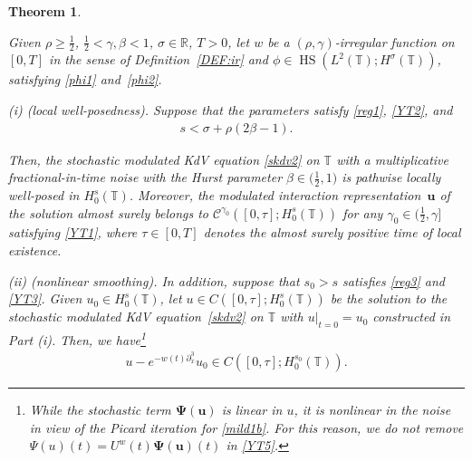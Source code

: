 \documentclass[letterpaper, 11pt,  reqno]{amsart}
\newtheorem{theorem}{Theorem} [section]
\DeclareMathOperator{\HS}{HS}
\newcommand{\1}{\hspace{0.5mm}\textup{I}\hspace{0.5mm}}
\newcommand{\noi}{\noindent}
\newcommand{\R}{\mathbb{R}}
\newcommand{\T}{\mathbb{T}}
\newcommand{\CC}{\mathcal{C}}
\newcommand{\be}{\beta}
\newcommand{\g}{\gamma}
\newcommand{\s}{\sigma}
\newcommand{\dx}{\partial_x}
\newcommand{\uw}{U^w}
\newcommand{\uu}{\mathbf{u}}
\newcommand{\PPsi}{\pmb{\Psi}}
\numberwithin{equation}{section}
\numberwithin{theorem}{section}
\begin{document}
\begin{theorem}\label{THM:2}


Given 
$\rho \ge\frac 12$,
$\frac 12 < \g, \be < 1$, $ \s \in \R$, $T > 0$, 
let 
$w$ be 
 a $(\rho,\g)$-irregular function on $[0, T]$ in the sense of Definition~\ref{DEF:ir}
 and 
$\phi \in \HS(L^2(\T); H^\s(\T))$, satisfying 
\eqref{phi1} and~\eqref{phi2}.


\smallskip

\noi
\textup{(i) (local well-posedness).}
Suppose that
the parameters satisfy
 \eqref{reg1}, 
\eqref{YT2}, and
\begin{align}
s  < 
 \s +  \rho (2\be -1 ).
\label{YT4}
\end{align}

\noi
Then, the stochastic modulated KdV equation \eqref{skdv2}
on  $\T$
with a multiplicative fractional-in-time noise 
with the Hurst parameter $\be \in \big(\frac 12 , 1\big)$
is pathwise locally well-posed in $H^s_0(\T)$.
Moreover, the modulated interaction representation~$\uu$
of the solution almost surely belongs
to $\CC^{\g_0}([0, \tau]; H^s_0(\T))$
for any $ \g_0 \in \big(\frac 12 ,  \g\big] $ satisfying \eqref{YT1}, 
where 
 $\tau \in [0, T]$ denotes the almost surely positive  time of local existence.







\medskip

\noi
\textup{(ii) (nonlinear smoothing).}
In addition, 
suppose that $s_0 > s$ satisfies \eqref{reg3}
and \eqref{YT3}.
Given $u_0 \in H^s_0(\T)$, 
let $u
\in C([0, \tau]; H^s_0(\T))$ be the  solution 
to the stochastic  modulated KdV equation~\eqref{skdv2}
on $\T$
with $u|_{t = 0} = u_0$ constructed in Part (i).
Then, we have\footnote{While the stochastic term
$\PPsi(\uu)$ is linear in $u$, it is nonlinear in the noise
in view of the Picard iteration
for \eqref{mild1b}.
For this reason, we do not remove
$\Psi(u)(t) = \uw(t)\PPsi(\uu)(t)$ in \eqref{YT5}.} 
\begin{align}
 u - e^{-w(t) \dx^3}u_0 \in C([0, \tau]; H^{s_0}_0(\T)).
\label{YT5}
\end{align}




\end{theorem}
\end{document}
